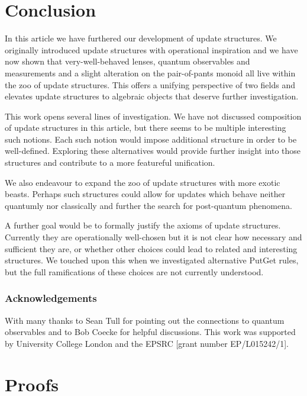 \documentclass[submission,copyright,creativecommons,sharealike,noncommercial]{eptcs}
\theoremstyle{definition}
\theoremstyle{plain}
\theoremstyle{plain}
\begin{document}
\section{Conclusion}
In this article we have furthered our development of update structures. We originally introduced update structures with operational inspiration and we have now shown that very-well-behaved lenses, quantum observables and measurements and a slight alteration on the pair-of-pants monoid all live within the zoo of update structures. This offers a unifying perspective of two fields and elevates update structures to algebraic objects that deserve further investigation.

This work opens several lines of investigation. We have not discussed composition of update structures in this article, but there seems to be multiple interesting such notions. Each such notion would impose additional structure in order to be well-defined. Exploring these alternatives would provide further insight into those structures and contribute to a more featureful unification.

We also endeavour to expand the zoo of update structures with more exotic beasts. Perhaps such structures could allow for updates which behave neither quantumly nor classically and further the search for post-quantum phenomena.

A further goal would be to formally justify the axioms of update structures. Currently they are operationally well-chosen but it is not clear how necessary and sufficient they are, or whether other choices could lead to related and interesting structures. We touched upon this when we investigated alternative PutGet rules, but the full ramifications of these choices are not currently understood.


\subsubsection*{Acknowledgements}
With many thanks to Sean Tull for pointing out the connections to quantum observables and to Bob Coecke for helpful discussions.
This work was supported by University College London and the EPSRC [grant number EP/L015242/1].








\appendix

\section{Proofs}
\end{document}
